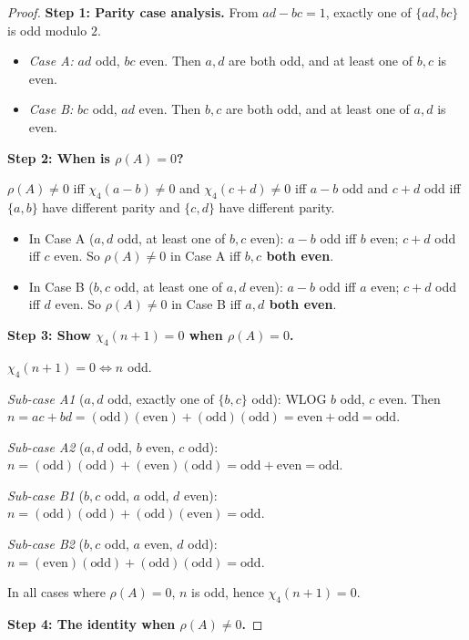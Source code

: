 \documentclass[11pt]{article}
\begin{document}
\begin{proof}
\textbf{Step 1: Parity case analysis.} From $ad - bc = 1$, exactly one of
$\{ad, bc\}$ is odd modulo $2$.
\begin{itemize}
\item \emph{Case A:} $ad$ odd, $bc$ even. Then $a, d$ are both odd, and at least
one of $b, c$ is even.
\item \emph{Case B:} $bc$ odd, $ad$ even. Then $b, c$ are both odd, and at least
one of $a, d$ is even.
\end{itemize}

\noindent\textbf{Step 2: When is $\rho(A) = 0$?}

$\rho(A) \ne 0$ iff $\chi_4(a-b) \ne 0$ and $\chi_4(c+d) \ne 0$ iff $a-b$ odd
and $c+d$ odd iff $\{a,b\}$ have different parity and $\{c,d\}$ have different
parity.
\begin{itemize}
\item In Case A ($a, d$ odd, at least one of $b, c$ even): $a - b$ odd iff $b$
even; $c + d$ odd iff $c$ even. So $\rho(A) \ne 0$ in Case A iff
\textbf{$b, c$ both even}.
\item In Case B ($b, c$ odd, at least one of $a, d$ even): $a - b$ odd iff $a$
even; $c + d$ odd iff $d$ even. So $\rho(A) \ne 0$ in Case B iff
\textbf{$a, d$ both even}.
\end{itemize}

\noindent\textbf{Step 3: Show $\chi_4(n+1) = 0$ when $\rho(A) = 0$.}

$\chi_4(n+1) = 0 \iff n$ odd.

\emph{Sub-case A1} ($a, d$ odd, exactly one of $\{b,c\}$ odd): WLOG $b$ odd,
$c$ even. Then $n = ac + bd = (\text{odd})(\text{even}) +
(\text{odd})(\text{odd}) = \text{even} + \text{odd} = \text{odd}$. \checkmark

\emph{Sub-case A2} ($a, d$ odd, $b$ even, $c$ odd):
$n = (\text{odd})(\text{odd}) + (\text{even})(\text{odd}) = \text{odd} +
\text{even} = \text{odd}$. \checkmark

\emph{Sub-case B1} ($b, c$ odd, $a$ odd, $d$ even):
$n = (\text{odd})(\text{odd}) + (\text{odd})(\text{even}) = \text{odd}$.
\checkmark

\emph{Sub-case B2} ($b, c$ odd, $a$ even, $d$ odd):
$n = (\text{even})(\text{odd}) + (\text{odd})(\text{odd}) = \text{odd}$.
\checkmark

In all cases where $\rho(A) = 0$, $n$ is odd, hence $\chi_4(n+1) = 0$.

\medskip
\noindent\textbf{Step 4: The identity when $\rho(A) \ne 0$.}


\end{proof}
\end{document}
